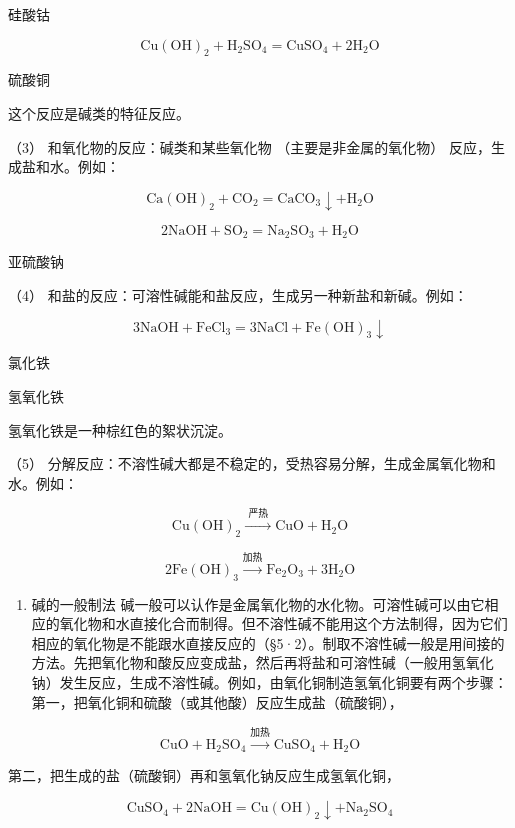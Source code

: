 硅酸钴

\[
\mathrm{Cu} (\mathrm{OH}) _ {2} + \mathrm{H}_{2} \mathrm{SO}_{4} = \mathrm{CuSO}_{4} + 2 \mathrm{H}_{2} \mathrm{O}
\]

硫酸铜

这个反应是碱类的特征反应。

（3） 和氧化物的反应：碱类和某些氧化物 （主要是非金属的氧化物）
反应，生成盐和水。例如：

\[
\mathrm{Ca(OH)}_{2} + \mathrm{CO}_{2} = \mathrm{CaCO}_{3} \downarrow + \mathrm{H}_{2} \mathrm{O}
\]

\[
2 \mathrm{NaOH} + \mathrm{SO}_{2} = \mathrm{Na}_{2} \mathrm{SO}_{3} + \mathrm{H}_{2} \mathrm{O}
\]

亚硫酸钠

（4） 和盐的反应：可溶性碱能和盐反应，生成另一种新盐和新碱。例如：

\[
3 \mathrm{NaOH} + \mathrm{FeCl}_{3} = 3 \mathrm{NaCl} + \mathrm{Fe(OH)}_{3} \downarrow
\]

氯化铁

氢氧化铁

氢氧化铁是一种棕红色的絮状沉淀。

（5）
分解反应：不溶性碱大都是不稳定的，受热容易分解，生成金属氧化物和水。例如：

\[
\mathrm{Cu(OH)}_{2} \xrightarrow {\text{ 严热 }} \mathrm{CuO} + \mathrm{H}_{2} \mathrm{O}
\]

\[
2 \mathrm{Fe(OH)}_{3} \xrightarrow {\text{加热}} \mathrm{Fe}_{2} \mathrm{O}_{3} + 3 \mathrm{H}_{2} \mathrm{O}
\]

\begin{enumerate}[start=2]
\item
  碱的一般制法
  碱一般可以认作是金属氧化物的水化物。可溶性碱可以由它相应的氧化物和水直接化合而制得。但不溶性碱不能用这个方法制得，因为它们相应的氧化物是不能跟水直接反应的（§5·2）。制取不溶性碱一般是用间接的方法。先把氧化物和酸反应变成盐，然后再将盐和可溶性碱（一般用氢氧化钠）发生反应，生成不溶性碱。例如，由氧化铜制造氢氧化铜要有两个步骤：第一，把氧化铜和硫酸（或其他酸）反应生成盐（硫酸铜），
\end{enumerate}

\[
\mathrm{CuO} + \mathrm{H}_{2} \mathrm{SO}_{4} \xrightarrow {\text{加热}} \mathrm{CuSO}_{4} + \mathrm{H}_{2} \mathrm{O}
\]

第二，把生成的盐（硫酸铜）再和氢氧化钠反应生成氢氧化铜，

\[
\mathrm{CuSO}_{4} + 2 \mathrm{NaOH} = \mathrm{Cu(OH)}_{2} \downarrow + \mathrm{Na}_{2} \mathrm{SO}_{4}
\]

